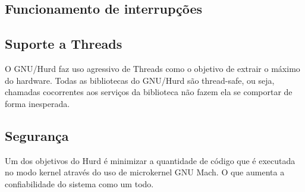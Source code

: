 \documentclass[conference]{IEEEtran}
\begin{document}
\subsection{Funcionamento de interrupções}\label{sec:HurdInt}

\subsection{Suporte a Threads}\label{sec:HurdThreads}
O GNU/Hurd faz uso agressivo de Threads como o objetivo de extrair o máximo do hardware.\cite{Hurd} Todas as bibliotecas do GNU/Hurd são thread-safe, ou seja, chamadas cocorrentes aos serviços da biblioteca não fazem ela se comportar de forma inesperada.

\subsection{Segurança}\label{sec:HurdSec}
Um dos objetivos do Hurd é minimizar a quantidade de código que é executada no modo kernel através do uso de microkernel GNU Mach. O que aumenta a confiabilidade do sistema como um todo.



\end{document}
